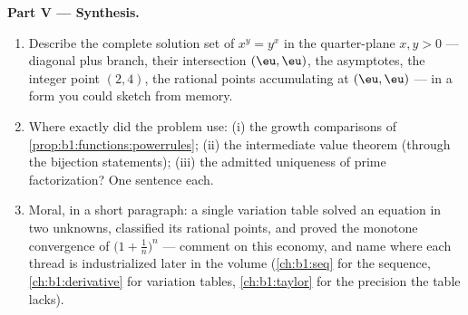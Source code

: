 \begin{problem}
\medskip
\noindent\textbf{Part V --- Synthesis.}
\begin{enumerate}[resume]
  \item Describe the complete solution set of $x^y = y^x$ in the
        quarter-plane $x, y > 0$ --- diagonal plus branch, their
        intersection $(\eu, \eu)$, the asymptotes, the integer
        point $(2, 4)$, the rational points accumulating at
        $(\eu, \eu)$ --- in a form you could sketch from memory.
  \item Where exactly did the problem use: (i) the growth
        comparisons of \cref{prop:b1:functions:powerrules}; (ii)
        the intermediate value theorem (through the bijection
        statements); (iii) the admitted uniqueness of prime
        factorization? One sentence each.
  \item Moral, in a short paragraph: a single variation table
        solved an equation in two unknowns, classified its
        rational points, and proved the monotone convergence of
        $\bigl(1 + \frac1n\bigr)^n$ --- comment on this economy,
        and name where each thread is industrialized later in the
        volume (\cref{ch:b1:seq} for the sequence,
        \cref{ch:b1:derivative} for variation tables,
        \cref{ch:b1:taylor} for the precision the table lacks).
\end{enumerate}
\end{problem}
